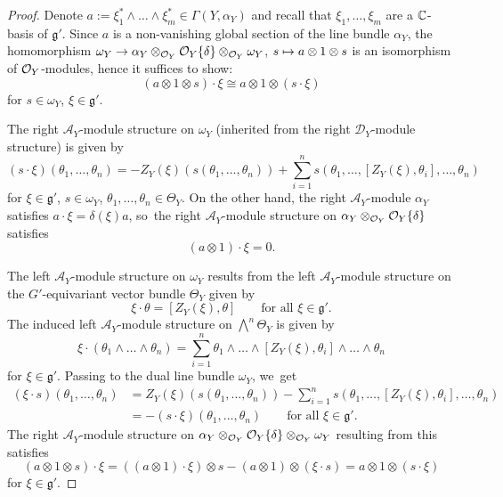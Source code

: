 \documentclass[11pt]{article}
\newcommand\mto{\mathchoice{\longmapsto}{\mapsto}{\mapsto}{\mapsto}}
\newcommand{\cA}{\mathscr{A}}
\newcommand{\frg}{\mathfrak{g}}
\begin{document}
\begin{proof}
Denote $a := \xi_1^* \wedge \dots \wedge \xi_m^* \in \Gamma(Y,\alpha_Y)$ and recall that $\xi_1,\dots,\xi_m$ are a ${\mathbb C}$-basis of $\frg'$. Since $a$ is a non-vanishing global section of the line bundle $\alpha_Y$, the homomorphism $\omega_Y \to \alpha_Y \otimes_{\mathcal{O}_Y} \mathcal{O}_Y\{\delta\} \otimes_{\mathcal{O}_Y} \omega_Y$, $s \mto a \otimes 1 \otimes s$ is an isomorphism of $\mathcal{O}_Y$\nobreakdash-mod\-ules, hence it suffices to show:
\[
(a \otimes 1 \otimes s) \cdot \xi \cong a \otimes 1 \otimes (s \cdot \xi)
\]
for $s \in \omega_Y$, $\xi \in \frg'$.

The right $\cA_Y$\nobreakdash-mod\-ule structure on $\omega_Y$ (inherited from the right $\mathscr{D}_Y$\nobreakdash-mod\-ule structure) is given by
\[
(s \cdot \xi)(\theta_1,\dots,\theta_n) = -Z_Y(\xi)(s(\theta_1,\dots,\theta_n))+\sum_{i=1}^n s(\theta_1,\dots,[Z_Y(\xi),\theta_i],\dots,\theta_n)
\]
for $\xi \in \frg'$, $s \in \omega_Y$, $\theta_1,\dots, \theta_n \in \Theta_Y$. On the other hand, the right $\cA_Y$\nobreakdash-mod\-ule $\alpha_Y$ satisfies $a \cdot \xi = \delta(\xi) a$, so~the right $\cA_Y$\nobreakdash-mod\-ule structure on $\alpha_Y \otimes_{\mathcal{O}_Y} \mathcal{O}_Y\{\delta\}$ satisfies
\[
(a \otimes 1) \cdot \xi = 0.
\]

The left $\cA_Y$\nobreakdash-mod\-ule structure on $\omega_Y$ results from the left $\cA_Y$\nobreakdash-mod\-ule structure on the $G'$-equivariant vector bundle $\Theta_Y$ given by
\[
\xi \cdot \theta = [Z_Y(\xi),\theta] \qquad \text{for all } \xi \in \frg'.
\]
The induced left $\cA_Y$\nobreakdash-mod\-ule structure on $\bigwedge^n \Theta_Y$ is given by
\[
\xi \cdot (\theta_1 \wedge \dots \wedge \theta_n) = \sum_{i=1}^n \theta_1 \wedge \dots \wedge [Z_Y(\xi),\theta_i] \wedge \dots \wedge \theta_n
\]
for $\xi \in \frg'$. Passing to the dual line bundle $\omega_Y$, we~get
\begin{align*}(\xi \cdot s)(\theta_1,\dots,\theta_n) &= Z_Y(\xi)(s(\theta_1,\dots,\theta_n))-\sum_{i=1}^n s(\theta_1,\dots,[Z_Y(\xi),\theta_i],\dots,\theta_n) \\
&= -(s \cdot \xi)(\theta_1,\dots,\theta_n) \qquad \text{for all }\xi \in \frg'.
\end{align*}
The right $\cA_Y$\nobreakdash-mod\-ule structure on $\alpha_Y \otimes_{\mathcal{O}_Y} \mathcal{O}_Y\{\delta\} \otimes_{\mathcal{O}_Y} \omega_Y$ resulting from this satisfies
\[
(a \otimes 1 \otimes s) \cdot \xi
= ((a \otimes 1) \cdot \xi) \otimes s - (a \otimes 1) \otimes (\xi \cdot s) = a \otimes 1 \otimes (s \cdot \xi)
\]
for $\xi \in \frg'$.
\end{proof}
\end{document}
